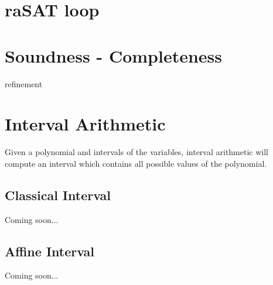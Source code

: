 \section{raSAT loop}
\section{Soundness - Completeness}
refinement
\section{Interval Arithmetic}
Given a polynomial and intervals of the variables, interval arithmetic will compute an interval which contains all possible values of the polynomial. 
\subsection{Classical Interval}
Coming soon...
\subsection{Affine Interval}
Coming soon...

